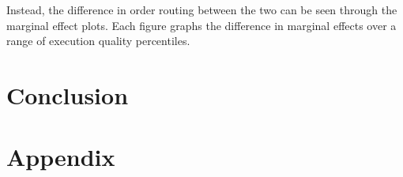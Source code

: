 \documentclass[12pt,a4paper]{article}
\begin{document}
Instead, the difference in order routing between the two can be seen through the marginal effect plots. Each figure graphs the difference in marginal effects over a range of execution quality percentiles. 







\section{Conclusion}



\pagebreak
\section{Appendix}
\end{document}
